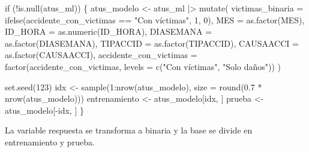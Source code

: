 \documentclass[
  spanish,
  11pt,
  letterpaper,
]{book}
\newenvironment{Shaded}{}{}
\newcommand{\AttributeTok}[1]{\textcolor[rgb]{0.84,0.23,0.29}{#1}}
\newcommand{\ControlFlowTok}[1]{\textcolor[rgb]{0.84,0.23,0.29}{#1}}
\newcommand{\DecValTok}[1]{\textcolor[rgb]{0.00,0.36,0.77}{#1}}
\newcommand{\FloatTok}[1]{\textcolor[rgb]{0.00,0.36,0.77}{#1}}
\newcommand{\FunctionTok}[1]{\textcolor[rgb]{0.44,0.26,0.76}{#1}}
\newcommand{\NormalTok}[1]{\textcolor[rgb]{0.14,0.16,0.18}{#1}}
\newcommand{\OtherTok}[1]{\textcolor[rgb]{0.44,0.26,0.76}{#1}}
\newcommand{\SpecialCharTok}[1]{\textcolor[rgb]{0.00,0.36,0.77}{#1}}
\newcommand{\StringTok}[1]{\textcolor[rgb]{0.01,0.18,0.38}{#1}}
\begin{document}
\begin{Shaded}
\begin{Highlighting}[]
\ControlFlowTok{if}\NormalTok{ (}\SpecialCharTok{!}\FunctionTok{is.null}\NormalTok{(atus\_ml)) \{}
\NormalTok{  atus\_modelo }\OtherTok{\textless{}{-}}\NormalTok{ atus\_ml }\SpecialCharTok{|\textgreater{}}
    \FunctionTok{mutate}\NormalTok{(}
      \AttributeTok{victimas\_binaria =} \FunctionTok{ifelse}\NormalTok{(accidente\_con\_victimas }\SpecialCharTok{==} \StringTok{"Con víctimas"}\NormalTok{, }\DecValTok{1}\NormalTok{, }\DecValTok{0}\NormalTok{),}
      \AttributeTok{MES =} \FunctionTok{as.factor}\NormalTok{(MES),}
      \AttributeTok{ID\_HORA =} \FunctionTok{as.numeric}\NormalTok{(ID\_HORA),}
      \AttributeTok{DIASEMANA =} \FunctionTok{as.factor}\NormalTok{(DIASEMANA),}
      \AttributeTok{TIPACCID =} \FunctionTok{as.factor}\NormalTok{(TIPACCID),}
      \AttributeTok{CAUSAACCI =} \FunctionTok{as.factor}\NormalTok{(CAUSAACCI),}
      \AttributeTok{accidente\_con\_victimas =} \FunctionTok{factor}\NormalTok{(accidente\_con\_victimas, }\AttributeTok{levels =} \FunctionTok{c}\NormalTok{(}\StringTok{"Con víctimas"}\NormalTok{, }\StringTok{"Solo daños"}\NormalTok{))}
\NormalTok{    )}

  \FunctionTok{set.seed}\NormalTok{(}\DecValTok{123}\NormalTok{)}
\NormalTok{  idx }\OtherTok{\textless{}{-}} \FunctionTok{sample}\NormalTok{(}\DecValTok{1}\SpecialCharTok{:}\FunctionTok{nrow}\NormalTok{(atus\_modelo), }\AttributeTok{size =} \FunctionTok{round}\NormalTok{(}\FloatTok{0.7} \SpecialCharTok{*} \FunctionTok{nrow}\NormalTok{(atus\_modelo)))}
\NormalTok{  entrenamiento }\OtherTok{\textless{}{-}}\NormalTok{ atus\_modelo[idx, ]}
\NormalTok{  prueba }\OtherTok{\textless{}{-}}\NormalTok{ atus\_modelo[}\SpecialCharTok{{-}}\NormalTok{idx, ]}
\NormalTok{\}}
\end{Highlighting}
\end{Shaded}

\begin{tcolorbox}[enhanced jigsaw, arc=.35mm, bottomrule=.15mm, bottomtitle=1mm, breakable, colback=white, colbacktitle=quarto-callout-note-color!10!white, colframe=quarto-callout-note-color-frame, coltitle=black, left=2mm, leftrule=.75mm, opacityback=0, opacitybacktitle=0.6, rightrule=.15mm, title=\textcolor{quarto-callout-note-color}{\faInfo}\hspace{0.5em}{Explicación del código}, titlerule=0mm, toprule=.15mm, toptitle=1mm]

La variable respuesta se transforma a binaria y la base se divide en
entrenamiento y prueba.

\end{tcolorbox}
\end{document}
